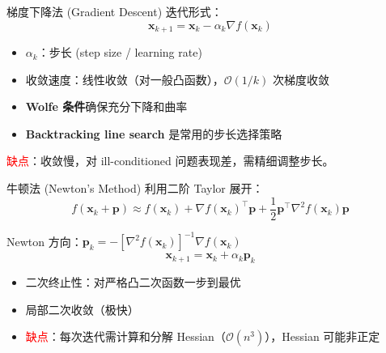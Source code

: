 \documentclass[11pt, aspectratio=169, svgnames, table, fontset=fandol]{ctexbeamer}
\begin{document}
\begin{frame}{梯度下降法 (Gradient Descent)}
  迭代形式：
  \begin{equation*}
    \bm{x}_{k+1} = \bm{x}_k - \alpha_k \nabla f(\bm{x}_k)
  \end{equation*}

  \begin{itemize}
    \item $\alpha_k$：步长 (step size / learning rate)
    \item 收敛速度：线性收敛（对一般凸函数），$\mathcal{O}(1/k)$ 次梯度收敛
    \item \textbf{Wolfe 条件}确保充分下降和曲率
    \item \textbf{Backtracking line search} 是常用的步长选择策略
  \end{itemize}

  \vspace{6pt}
  \textcolor{red}{缺点}：收敛慢，对 ill-conditioned 问题表现差，需精细调整步长。
\end{frame}

\begin{frame}{牛顿法 (Newton's Method)}
  利用二阶 Taylor 展开：
  \begin{equation*}
    f(\bm{x}_k + \bm{p}) \approx f(\bm{x}_k) + \nabla f(\bm{x}_k)^\top \bm{p} + \frac12 \bm{p}^\top \nabla^2 f(\bm{x}_k) \bm{p}
  \end{equation*}

  Newton 方向：$\bm{p}_k = -[\nabla^2 f(\bm{x}_k)]^{-1} \nabla f(\bm{x}_k)$
  \begin{equation*}
    \bm{x}_{k+1} = \bm{x}_k + \alpha_k \bm{p}_k
  \end{equation*}

  \begin{itemize}
    \item 二次终止性：对严格凸二次函数一步到最优
    \item 局部二次收敛（极快）
    \item \textcolor{red}{缺点}：每次迭代需计算和分解 Hessian（$\mathcal{O}(n^3)$），Hessian 可能非正定
  \end{itemize}
\end{frame}
\end{document}
